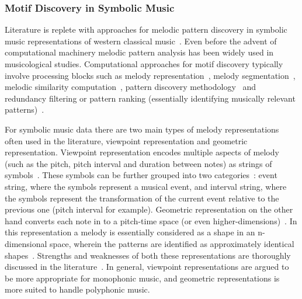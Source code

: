 \subsubsection{Motif Discovery in Symbolic Music}
\label{sec:motif_in_symbolic_music}

Literature is replete with approaches for melodic pattern discovery in symbolic music representations of western classical music~\citep{cambouropoulos1997towards,meredith2006point,conklin2001representation,Lartillot2005b}. Even before the advent of computational machinery melodic pattern analysis has been widely used in musicological studies. Computational approaches for motif discovery typically involve processing blocks such as melody representation~\citep{meredith2006point}, melody segmentation~\citep{Cambouropoulos2006}, melodic similarity computation~\citep{Cambouropoulos2001,Marsden2012}, pattern discovery methodology~\citep{collins2013siarct,meredith2002algorithms} and redundancy filtering or pattern ranking (essentially identifying musically relevant patterns)~\citep{Lartillot2005,conklin2010discovery}. 

For symbolic music data there are two main types of melody representations often used in the literature, viewpoint representation and geometric representation. Viewpoint representation encodes multiple aspects of melody (such as the pitch, pitch interval and duration between notes) as strings of symbols~\citep{conklin2001representation,conklin1995multiple}. These symbols can be further grouped into two categories~\citep{meredith2002algorithms}: event string, where the symbols represent a musical event, and interval string, where the symbols represent the transformation of the current event relative to the previous one (pitch interval for example). Geometric representation on the other hand converts each note in to a pitch-time space (or even higher-dimensions)~\citep{meredith2002algorithms}. In this representation a melody is essentially considered as a shape in an n-dimensional space, wherein the patterns are identified as approximately identical shapes~\citep{meredith2002algorithms}. Strengths and weaknesses of both these representations are thoroughly discussed in the literature~\citep{Cambouropoulos2009,meredith2002algorithms}. In general, viewpoint representations are argued to be more appropriate for monophonic music, and geometric representations is more suited to handle polyphonic music. 

